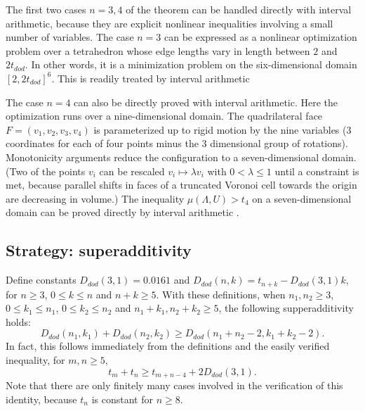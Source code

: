 \documentclass{article} %
\begin{document}
The first two cases $n=3,4$ of the theorem can be handled directly
with interval arithmetic, because they are explicit nonlinear
inequalities involving a small number of variables. The case $n=3$ can
be expressed as a nonlinear optimization problem over a tetrahedron
whose edge lengths vary in length between $2$ and $2t_{dod}$. In other
words, it is a minimization problem on the six-dimensional domain
$[2,2t_{dod}]^6$. This is readily treated by interval arithmetic
\cite{McLaughlin:2008:KeplerCode}

The case $n=4$ can also be directly proved with interval arithmetic.
Here the optimization runs over a nine-dimensional domain. The
quadrilateral face $F=(v_1,v_2,v_3,v_4)$ is parameterized up to rigid
motion by the nine variables (3 coordinates for each of four points
minus the 3 dimensional group of rotations). Monotonicity arguments
reduce the configuration to a seven-dimensional domain. (Two of the
points $v_i$ can be rescaled $v_i \mapsto \lambda v_i$ with $0 <
\lambda \le 1$ until a constraint is met, because parallel shifts in
faces of a truncated Voronoi cell towards the origin are decreasing in
volume.) The inequality $\mu(\Lambda,U)> t_4$ on a seven-dimensional
domain can be proved directly by interval arithmetic
\cite{McLaughlin:2008:KeplerCode}.

\subsection{Strategy: superadditivity}


Define constants $D_{dod}(3,1) = 0.0161$ and $D_{dod}(n,k) = t_{n+k} - D_{dod}(3,1)k$,
for $n\ge 3$, $0\le k\le n$ and $n+k\ge 5$.  With these definitions,
when $n_1,n_2\ge 3$, $0\le k_1\le n_1$, $0\le k_2\le n_2$ and $n_1+k_1,n_2+k_2\ge 5$,  the following supperadditivity holds:
\begin{equation}\label{eqn:super}
  D_{dod}(n_1,k_1) + D_{dod}(n_2,k_2) \ge D_{dod}(n_1+n_2-2,k_1+k_2-2).
\end{equation}
In fact, this follows immediately from the definitions and the
easily verified inequality,
for $m,n\ge 5$,
$$
t_m + t_n \ge t_{m+n-4} + 2 D_{dod}(3,1).
$$
Note that there are only finitely many cases involved in the
verification of this identity,
because $t_n$ is constant for $n\ge 8$.
\end{document}
